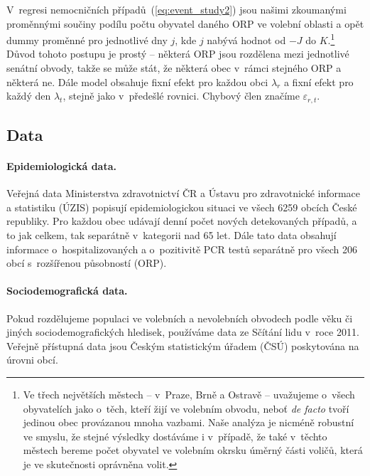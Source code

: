 V~regresi nemocničních případů~(\ref{eq:event_study2}) jsou našimi zkoumanými proměnnými sou\-či\-ny podílu počtu obyvatel daného ORP ve volební oblasti a opět dummy proměnné pro jednotlivé dny $j$, kde $j$ nabývá hodnot od $-J$ do $K$.\footnote{Ve třech největších městech -- v~Praze, Brně a Ostravě -- uvažujeme o~všech obyvatelích jako o~těch, kteří žijí ve volebním obvodu, neboť \textit{de facto} tvoří jedinou obec provázanou mnoha vazbami. Naše analýza je nicméně robustní ve smyslu, že stejné výsledky dostáváme i v~případě, že také v~těchto městech bereme počet obyvatel ve volebním okrsku úměrný části voličů, která je ve skutečnosti oprávněna volit.} Důvod tohoto postupu je prostý -- některá ORP jsou rozdělena mezi jednotlivé senátní obvody, takže se může stát, že některá obec v~rámci stejného ORP  a některá ne. Dále model obsahuje fixní efekt pro každou obci $\lambda_{r}$ a fixní efekt pro každý den $\lambda_{t}$, stejně jako v~předešlé rovnici. Chybový člen značíme $\varepsilon_{r,t}$.

\subsection*{Data}
\paragraph{Epidemiologická data.}  Veřejná data Ministerstva zdravotnictví ČR a Ústavu pro zdravotnické informace a statistiku (ÚZIS) popisují epidemiologickou situaci ve všech 6259 obcích České republiky. Pro každou obec udávají denní počet nových detekovaných případů, a to jak celkem, tak separátně v~kategorii nad 65 let. Dále tato data obsahují informace o~hospitalizovaných a o~pozitivitě PCR testů separátně pro všech 206 obcí s~rozšířenou působností (ORP). 

\paragraph{Sociodemografická data.} 
Pokud rozdělujeme populaci ve volebních a ne\-vo\-leb\-ních obvodech podle věku či jiných sociodemografických hledisek, používáme data ze Sčítání lidu v~roce 2011. Veřejně přístupná data jsou Českým statistickým úřadem (ČSÚ) poskytována na úrovni obcí.


